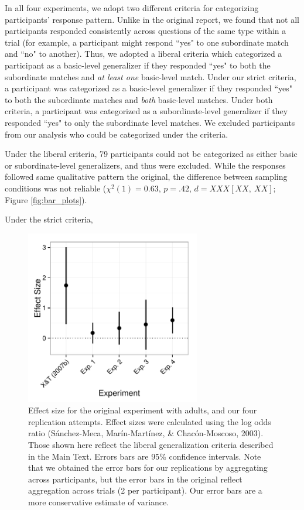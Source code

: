 \documentclass[man]{apa2}
\begin{document}
In all four experiments, we adopt two different criteria for categorizing participants' response pattern. Unlike in the original report, we found that not all participants responded consistently across questions of the same type within a trial (for example, a participant might respond ``yes" to one subordinate match and ``no" to another). Thus, we adopted a liberal criteria which categorized a participant as a basic-level generalizer if they responded ``yes" to both the subordinate matches and {\it at least one} basic-level match. Under our strict criteria, a participant was categorized as a basic-level generalizer if they responded ``yes" to both the subordinate matches and {\it both} basic-level matches.  Under both criteria, a participant was categorized as a subordinate-level generalizer if they responded ``yes" to only the subordinate level matches.  We excluded participants from our analysis who could be categorized under the criteria.

Under the liberal criteria, 79 participants could not be categorized as either basic or subordinate-level generalizers, and thus were excluded. While the   responses followed same qualitative pattern the original, the difference  between sampling conditions was not reliable ($\chi^2(1) = 0.63$,  $p = .42$,  $d = XXX [XX,\ XX]$; Figure \ref{fig:bar_plots}).

Under the strict criteria,





 \begin{figure} [t]
  \includegraphics[width=3in]{figures/FIG_3.pdf} 
  \caption{\label{fig:effect_sizes} Effect size for the original experiment with adults, and our four replication attempts.  Effect sizes were calculated using the log odds ratio (S\'{a}nchez-Meca, Mar\'{i}n-Mart\'{i}nez, \& Chac\'{o}n-Moscoso, 2003). Those shown here reflect the liberal generalization criteria described in the Main Text. Errors bars are 95\% confidence intervals. Note that we obtained the error bars for our replications by aggregating across participants, but the error bars in the original reflect aggregation across trials (2 per participant). Our error bars are a more conservative estimate of variance. } 
\end{figure}
\end{document}
